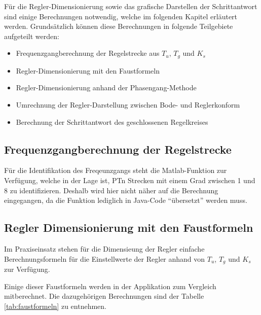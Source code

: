 F\"ur   die  Regler-Dimensionierung   sowie  das   grafische  Darstellen   der
Schrittantwort sind einige Berechnungen notwendig, welche im folgenden Kapitel
erl\"autert werden.   Grunds\"atzlich k\"onnen diese Berechnungen  in folgende
Teilgebiete aufgeteilt werden:

\begin{itemize}
    \item
        Frequenzgangberechnung der Regelstrecke aus $T_u$, $T_g$ und $K_s$
    \item
        Regler-Dimensionierung mit den Faustformeln
    \item
        Regler-Dimensionierung anhand der Phasengang-Methode
    \item
        Umrechnung der Regler-Darstellung zwischen Bode- und Reglerkonform
    \item
        Berechnung der Schrittantwort des geschlossenen Regelkreises
\end{itemize}


\subsection{Frequenzgangberechnung der Regelstrecke}

F\"ur  die  Identifikation  des  Freqeunzgangs steht  die  Matlab-Funktion
 zur  Verf\"ugung, welche in der Lage  ist, PTn  Strecken mit
einem Grad zwischen 1 und 8 zu identifizieren. Deshalb wird hier nicht n\"aher
auf  die  Berechnung  eingegangen,  da die  Funktion  lediglich  in  Java-Code
``\"ubersetzt'' werden muss.


\subsection{Regler Dimensionierung mit den Faustformeln}

Im   Praxiseinsatz  stehen   f\"ur   die  Dimensieung   der  Regler   einfache
Berechnungsformeln f\"ur die Einstellwerte der  Regler anhand von $T_u$, $T_g$
und $K_s$ zur Verf\"ugung.

Einige   dieser  Faustformeln   werden  in   der  Applikation   zum  Vergleich
mitberechnet. Die    dazugeh\"origen    Berechnungen    sind    der    Tabelle
\ref{tab:faustformeln} zu entnehmen.


